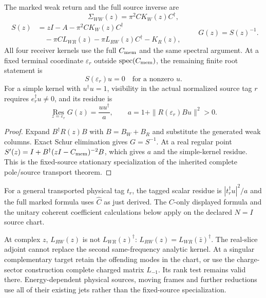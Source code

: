 \documentclass[12pt,a4paper]{article}
\begin{document}
\begin{theorem}
\label{p5c:thm:v2168-complete-weak-memory}
The marked weak return and the full source inverse are
\[
 \boxed{\Sigma_{WW}(z)=\pi^2 C K_W(z)C^\dagger,}
\]
\[
 \boxed{\begin{aligned}
 S(z)&=zI-A-\pi^2 CK_W(z)C^\dagger\\
 &\quad-\pi C L_{WR}(z)-\pi L_{RW}(z)C^\dagger-K_R(z),
 \end{aligned}}
 \qquad G(z)=S(z)^{-1}.
\]
All four receiver kernels use the full $C_{\rm mem}$ and the same spectral
argument. At a fixed terminal coordinate $\varepsilon_r$ outside
$\operatorname{spec}(C_{\rm mem})$, the remaining finite root statement is
\[
 \boxed{S(\varepsilon_r)u=0\quad\text{for a nonzero }u.}
\]
For a simple kernel with $u^\dagger u=1$, visibility in the actual normalized
source tag $r$ requires $e_r^\dagger u\ne0$, and its residue is
\[
 \boxed{\operatorname*{Res}_{z=\varepsilon_r}G(z)
       =\frac{uu^\dagger}{a},\qquad
 a=1+\|R(\varepsilon_r)Bu\|^2>0.}
\]
\end{theorem}
\begin{proof}
Expand $B^\dagger R(z)B$ with $B=B_W+B_R$ and substitute the generated
weak columns. Exact Schur elimination gives $G=S^{-1}$.
At a real regular point
$S'(z)=I+B^\dagger(zI-C_{\rm mem})^{-2}B$, which gives $a$ and the
simple-kernel residue. This is the fixed-source stationary specialization
of the inherited complete pole/source transport theorem.
\end{proof}

For a general transported physical tag $t_r$, the tagged scalar residue
is $|t_r^\dagger u|^2/a$ and the full marked formula uses $\widehat C$
as just derived. The $C$-only displayed formula and the unitary coherent
coefficient calculations below apply on the declared $N=I$ source chart.

At complex $z$, $L_{RW}(z)$ is not $L_{WR}(z)^\dagger$:
$L_{RW}(z)=L_{WR}(\bar z)^\dagger$. The real-slice adjoint cannot replace
the second same-frequency analytic kernel. At a singular complementary
target retain the offending modes in the chart, or use the charge-sector construction complete
charged matrix $L_{-1}$. Its rank test remains valid there.
Energy-dependent physical sources, moving frames and further reductions
use all of their existing jets rather than the fixed-source specialization.
\end{document}

